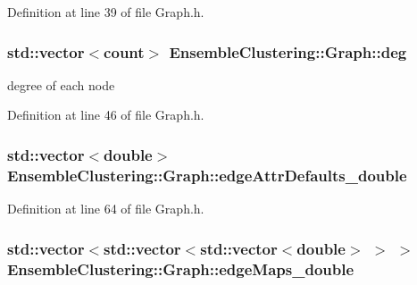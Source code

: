 Definition at line 39 of file Graph.\-h.

\hypertarget{class_ensemble_clustering_1_1_graph_a01f5bb5d01cdacd144c735939d7e8512}{
\subsubsection[{deg}]{\setlength{\rightskip}{0pt plus 5cm}std\-::vector$<${\bf count}$>$ Ensemble\-Clustering\-::\-Graph\-::deg\hspace{0.3cm}{\ttfamily [protected]}}}\label{class_ensemble_clustering_1_1_graph_a01f5bb5d01cdacd144c735939d7e8512}


degree of each node 



Definition at line 46 of file Graph.\-h.

\hypertarget{class_ensemble_clustering_1_1_graph_a485f434104cddb3d6fa7250ac0b29cf7}{
\subsubsection[{edge\-Attr\-Defaults\-\_\-double}]{\setlength{\rightskip}{0pt plus 5cm}std\-::vector$<$double$>$ Ensemble\-Clustering\-::\-Graph\-::edge\-Attr\-Defaults\-\_\-double\hspace{0.3cm}{\ttfamily [protected]}}}\label{class_ensemble_clustering_1_1_graph_a485f434104cddb3d6fa7250ac0b29cf7}


Definition at line 64 of file Graph.\-h.

\hypertarget{class_ensemble_clustering_1_1_graph_a2c6d3e520d36c058bd171671e6d217a2}{
\subsubsection[{edge\-Maps\-\_\-double}]{\setlength{\rightskip}{0pt plus 5cm}std\-::vector$<$std\-::vector$<$std\-::vector$<$double$>$ $>$ $>$ Ensemble\-Clustering\-::\-Graph\-::edge\-Maps\-\_\-double\hspace{0.3cm}{\ttfamily [protected]}}}\label{class_ensemble_clustering_1_1_graph_a2c6d3e520d36c058bd171671e6d217a2}



